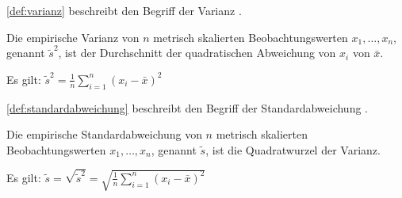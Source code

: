 \autoref{def:varianz} beschreibt den Begriff der Varianz
\autocite[Vgl.][S.399]{CorrelationBetweenRelatives}.
\begin{definition}
    Die empirische Varianz von $n$ metrisch skalierten Beobachtungswerten $x_1,
    \dots, x_n$, genannt $\tilde{s}^2$, ist der Durchschnitt der quadratischen
    Abweichung von $x_i$ von $\bar{x}$.

    Es gilt: $\tilde{s}^2 = \frac{1}{n} \displaystyle\sum^{n}_{i=1}(x_i - \bar{x})^2 $
    \label{def:varianz}
\end{definition}

\autoref{def:standardabweichung} beschreibt den Begriff der Standardabweichung
\autocite[Vgl.][S.80]{ContributionsToTheMathematicalTheory}.
\begin{definition}
    Die empirische Standardabweichung von $n$ metrisch skalierten Beobachtungswerten $x_1,
    \dots, x_n$, genannt $\tilde{s}$, ist die Quadratwurzel der Varianz.

    Es gilt: $\tilde{s} = \sqrt{\tilde{s}^2} = \sqrt{\frac{1}{n}
    \displaystyle\sum^{n}_{i=1}(x_i - \bar{x})^2} $
    \label{def:standardabweichung}
\end{definition}

